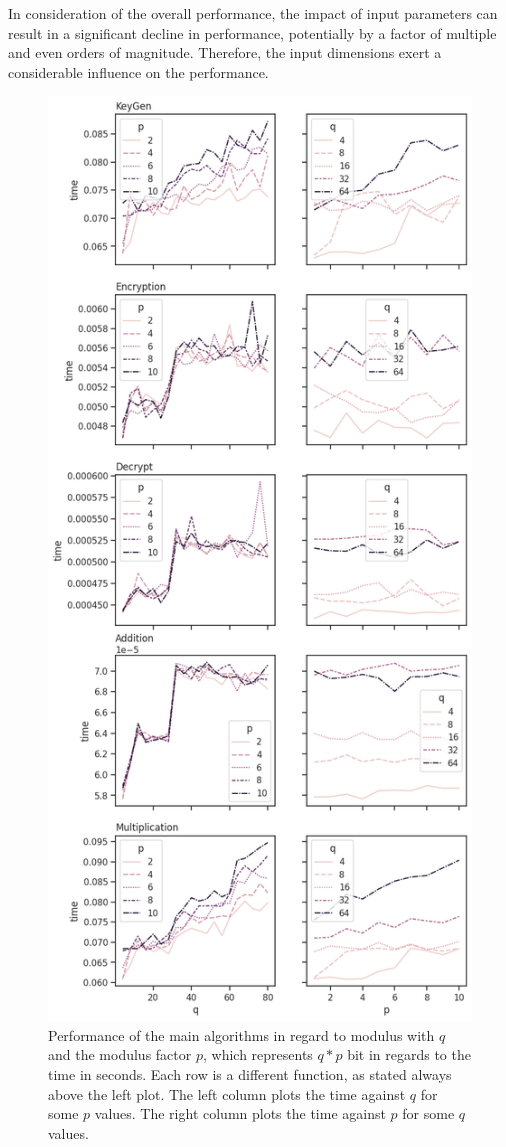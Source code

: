In consideration of the overall performance, the impact of input parameters can result in a significant decline in performance, potentially by a factor of multiple and even orders of magnitude. Therefore, the input dimensions exert a considerable influence on the performance.

\begin{figure}[htp]
  \centering
  \includegraphics[scale=0.48]{images/qp-performance.png}
  \caption[Performance of the HE algorithms by $q$ and $p$]{Performance of the main algorithms in regard to modulus with $q$ and the modulus factor $p$, which represents $q*p$ bit in regards to the time in seconds. Each row is a different function, as stated always above the left plot. The left column plots the time against $q$ for some $p$ values. The right column plots the time against $p$ for some $q$ values.}
  \label{fig:qp-performance}
\end{figure}


